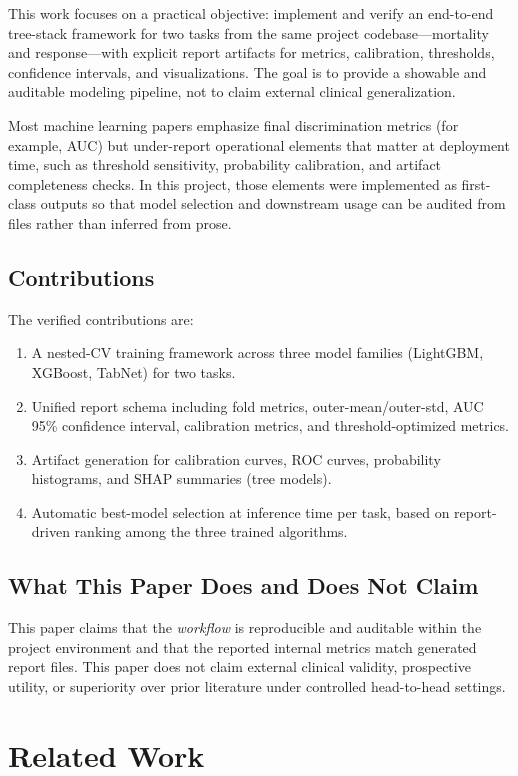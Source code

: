\documentclass[journal]{IEEEtran}
\begin{document}
This work focuses on a practical objective: implement and verify an end-to-end tree-stack framework for two tasks from the same project codebase---mortality and response---with explicit report artifacts for metrics, calibration, thresholds, confidence intervals, and visualizations. The goal is to provide a showable and auditable modeling pipeline, not to claim external clinical generalization.

Most machine learning papers emphasize final discrimination metrics (for example, AUC) but under-report operational elements that matter at deployment time, such as threshold sensitivity, probability calibration, and artifact completeness checks. In this project, those elements were implemented as first-class outputs so that model selection and downstream usage can be audited from files rather than inferred from prose.

\subsection{Contributions}
The verified contributions are:
\begin{enumerate}
    \item A nested-CV training framework across three model families (LightGBM, XGBoost, TabNet) for two tasks.
    \item Unified report schema including fold metrics, outer-mean/outer-std, AUC 95\% confidence interval, calibration metrics, and threshold-optimized metrics.
    \item Artifact generation for calibration curves, ROC curves, probability histograms, and SHAP summaries (tree models).
    \item Automatic best-model selection at inference time per task, based on report-driven ranking among the three trained algorithms.
\end{enumerate}

\subsection{What This Paper Does and Does Not Claim}
This paper claims that the \emph{workflow} is reproducible and auditable within the project environment and that the reported internal metrics match generated report files. This paper does not claim external clinical validity, prospective utility, or superiority over prior literature under controlled head-to-head settings.

\section{Related Work}
\end{document}
